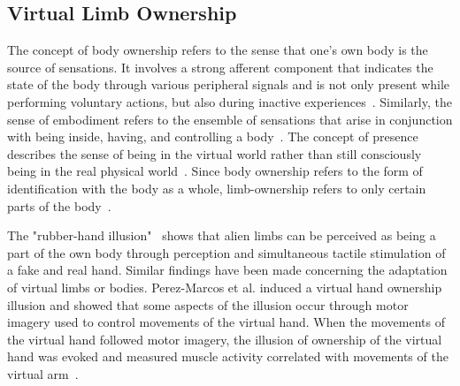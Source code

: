 \documentclass[sigconf]{acmart}
\begin{document}
\subsection{Virtual Limb Ownership}
The concept of body ownership refers to the sense that one's own body is the source of sensations. It involves a strong afferent component that indicates the state of the body through various peripheral signals and is not only present while performing voluntary actions, but also during inactive experiences~\cite{Tsakiris2006}.
Similarly, the sense of embodiment refers to the ensemble of sensations that arise in conjunction with being inside, having, and controlling a body~\cite{Kilteni2012}.
The concept of presence describes the sense of being in the virtual world rather than still consciously being in the real physical world~\cite{Sanchez-vives2005}.
Since body ownership refers to the form of identification with the body as a whole, limb-ownership refers to only certain parts of the body~\cite{Braun2018}.

The "rubber-hand illusion"~\cite{Botvinick2006} shows that alien limbs can be perceived as being a part of the own body through perception and simultaneous tactile stimulation of a fake and real hand.
Similar findings have been made concerning the adaptation of virtual limbs or bodies.
Perez-Marcos et al. induced a virtual hand ownership illusion and showed that some aspects of the illusion occur through motor imagery used to control movements of the virtual hand.
When the movements of the virtual hand followed motor imagery, the illusion of ownership of the virtual hand was evoked and measured muscle activity correlated with movements of the virtual arm~\cite{Perez-Marcos2009}.
\end{document}
